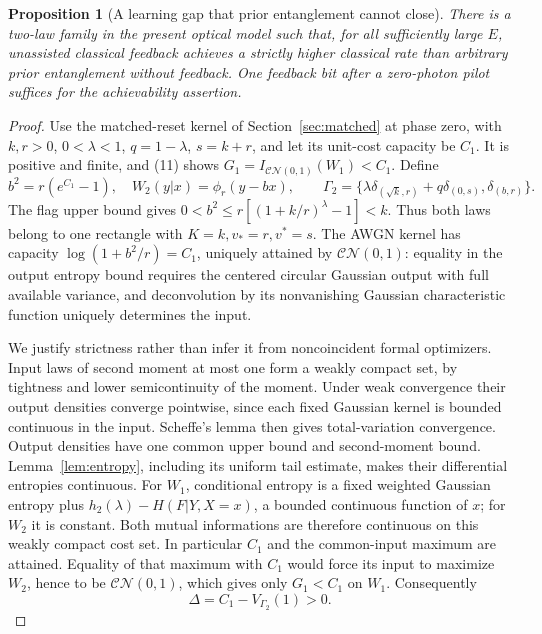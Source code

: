 \documentclass[11pt]{article}
\newtheorem{proposition}[theorem]{Proposition}
\newcommand{\CN}{\mathcal{CN}}
\begin{document}
\begin{proposition}[A learning gap that prior entanglement cannot close]
\label{prop:learning}
There is a two-law family in the present optical model such that, for
all sufficiently large \(E\), unassisted classical feedback achieves a
strictly higher classical rate than arbitrary prior entanglement without
feedback. One feedback bit after a zero-photon pilot suffices for the
achievability assertion.
\end{proposition}
\begin{proof}
Use the matched-reset kernel of Section~\ref{sec:matched} at phase zero, with
\(k,r>0\), \(0<\lambda<1\), \(q=1-\lambda\), \(s=k+r\), and let its
unit-cost capacity be \(C_1\). It is positive and finite, and (11) shows
\(G_1=I_{\CN(0,1)}(W_1)<C_1\). Define
\[
 b^2=r(e^{C_1}-1),\quad W_2(y|x)=\phi_r(y-bx),\qquad
 \Gamma_2=\{\lambda\delta_{(\sqrt k,r)}+q\delta_{(0,s)},
                      \delta_{(b,r)}\}.
\]
The flag upper bound gives \(0<b^2\leq r[(1+k/r)^\lambda-1]<k\).
Thus both laws belong to one rectangle with \(K=k,v_*=r,v^*=s\).
The AWGN kernel has capacity \(\log(1+b^2/r)=C_1\), uniquely attained
by \(\CN(0,1)\): equality in the output entropy bound requires the
centered circular Gaussian output with full available variance, and
deconvolution by its nonvanishing Gaussian characteristic function
uniquely determines the input.

We justify strictness rather than infer it from noncoincident formal
optimizers. Input laws of second moment at most one form a weakly compact
set, by tightness and lower semicontinuity of the moment. Under weak
convergence their output densities converge pointwise, since each fixed
Gaussian kernel is bounded continuous in the input. Scheffe's lemma then
gives total-variation convergence. Output densities have one common
upper bound and second-moment bound. Lemma~\ref{lem:entropy}, including
its uniform tail estimate, makes their differential entropies continuous.
For \(W_1\), conditional entropy is a fixed weighted Gaussian entropy
plus \(h_2(\lambda)-H(F|Y,X=x)\), a bounded continuous function of
\(x\); for \(W_2\) it is constant. Both mutual informations are
therefore continuous on this weakly compact cost set. In particular
\(C_1\) and the common-input maximum are attained. Equality of that
maximum with \(C_1\) would force its input to maximize \(W_2\), hence
to be \(\CN(0,1)\), which gives only \(G_1<C_1\) on \(W_1\).
Consequently
\[
 \Delta=C_1-V_{\Gamma_2}(1)>0.                         \tag{26}
\]


\end{proof}
\end{document}
